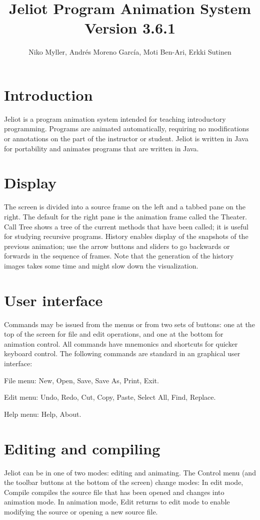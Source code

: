 \documentclass{article}
\title{Jeliot Program Animation System\\Version 3.6.1}
\author{Niko Myller, Andr{\'{e}}s Moreno Garc{\'{i}}a, Moti Ben-Ari, Erkki Sutinen}
\begin{document}
\maketitle

\section{Introduction}

Jeliot is a program animation system intended for teaching introductory 
programming. Programs are animated automatically, requiring no modifications or 
annotations on the part of the instructor or student. Jeliot is written in Java 
for portability and animates programs that are written in Java.

\section{Display}

The screen is divided into a source frame on the left and a tabbed pane on the 
right. The default for the right pane is the animation frame called the 
Theater. Call Tree shows a tree of the current methods that have been called; 
it is useful for studying recursive programs. History enables display of the 
snapshots of the previous animation; use the arrow buttons and sliders to go 
backwards or forwards in the sequence of frames. Note that the generation of
the history images takes some time and might slow down the visualization.

\section{User interface}
Commands may be issued from the menus or from two sets of buttons: one at the 
top of the screen for file and edit operations, and one at the bottom for 
animation control. All commands have mnemonics and shortcuts for quicker 
keyboard control. The following commands are standard in an graphical user 
interface:

File menu: New, Open, Save, Save As, Print, Exit.

Edit menu: Undo, Redo, Cut, Copy, Paste, Select All, Find, Replace.

Help menu: Help, About.

\section{Editing and compiling}
Jeliot can be in one of two modes: editing and animating. The Control menu (and 
the toolbar buttons at the bottom of the screen) change modes: In edit mode, 
Compile compiles the source file that has been opened and changes into 
animation mode. In animation mode, Edit returns to edit mode to enable 
modifying the source or opening a new source file.
\end{document}
